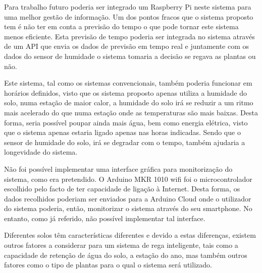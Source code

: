 \documentclass[conference]{IEEEtran}
\begin{document}
Para trabalho futuro poderia ser integrado um Raspberry Pi neste sistema para uma melhor 
gestão de informação. Um dos pontos fracos que o sistema proposto tem é não 
ter em conta a previsão do tempo o que pode tornar este sistema menos eficiente. 
Esta previsão de tempo poderia ser integrada no sistema através de um API que 
envia os dados de previsão em tempo real e juntamente com os dados do sensor de 
humidade o sistema tomaria a decisão se regava as plantas ou não.

Este sistema, tal como os sistemas convencionais, também poderia funcionar em horários definidos, 
visto que os sistema proposto apenas utiliza a humidade do solo, numa estação de maior calor, a humidade do solo 
irá se reduzir a um ritmo mais acelerado do que numa estação onde as temperaturas são mais baixas. Desta forma, 
seria possível poupar ainda mais água, bem como energia elétrica, visto que o sistema apenas estaria ligado apenas 
nas horas indicadas. Sendo que o sensor de humidade do solo, irá se degradar com o tempo, também ajudaria a 
longevidade do sistema.

Não foi possível implementar uma interface gráfica para monitorização do sistema, como era pretendido. 
O Arduino MKR 1010 wifi foi o microcontrolador escolhido pelo facto de ter capacidade de ligação à Internet. 
Desta forma, os dados recolhidos poderiam ser enviados para a Arduino Cloud onde o utilizador do sistema poderia, 
então, monitorizar o sistema através do seu smartphone. No entanto, como já referido, não possível 
implementar tal interface.

Diferentes solos têm características diferentes e devido a estas diferenças, existem outros 
fatores a considerar para um sistema de rega inteligente, tais como a capacidade de retenção de água do solo, 
a estação do ano, mas também outros fatores como o tipo de plantas para o qual o sistema será utilizado.



\end{document}
